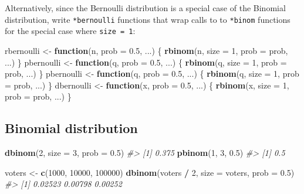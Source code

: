 \documentclass[]{book}
\newenvironment{Shaded}{\begin{snugshade}}{\end{snugshade}}
\newcommand{\KeywordTok}[1]{\textcolor[rgb]{0.13,0.29,0.53}{\textbf{#1}}}
\newcommand{\DataTypeTok}[1]{\textcolor[rgb]{0.13,0.29,0.53}{#1}}
\newcommand{\DecValTok}[1]{\textcolor[rgb]{0.00,0.00,0.81}{#1}}
\newcommand{\FloatTok}[1]{\textcolor[rgb]{0.00,0.00,0.81}{#1}}
\newcommand{\StringTok}[1]{\textcolor[rgb]{0.31,0.60,0.02}{#1}}
\newcommand{\CommentTok}[1]{\textcolor[rgb]{0.56,0.35,0.01}{\textit{#1}}}
\newcommand{\ControlFlowTok}[1]{\textcolor[rgb]{0.13,0.29,0.53}{\textbf{#1}}}
\newcommand{\OperatorTok}[1]{\textcolor[rgb]{0.81,0.36,0.00}{\textbf{#1}}}
\newcommand{\NormalTok}[1]{#1}
\theoremstyle{definition}
\theoremstyle{definition}
\theoremstyle{definition}
\theoremstyle{remark}
\begin{document}
Alternatively, since the Bernoulli distribution is a special case of the
Binomial distribution, write \texttt{*bernoulli} functions that wrap
calls to to \texttt{*binom} functions for the special case where
\texttt{size\ =\ 1}:

\begin{Shaded}
\begin{Highlighting}[]
\NormalTok{rbernoulli <-}\StringTok{ }\ControlFlowTok{function}\NormalTok{(n, }\DataTypeTok{prob =} \FloatTok{0.5}\NormalTok{, ...) \{}
  \KeywordTok{rbinom}\NormalTok{(n, }\DataTypeTok{size =} \DecValTok{1}\NormalTok{, }\DataTypeTok{prob =}\NormalTok{ prob, ...)}
\NormalTok{\}}
\NormalTok{pbernoulli <-}\StringTok{ }\ControlFlowTok{function}\NormalTok{(q, }\DataTypeTok{prob =} \FloatTok{0.5}\NormalTok{, ...) \{}
  \KeywordTok{rbinom}\NormalTok{(q, }\DataTypeTok{size =} \DecValTok{1}\NormalTok{, }\DataTypeTok{prob =}\NormalTok{ prob, ...)}
\NormalTok{\}}
\NormalTok{pbernoulli <-}\StringTok{ }\ControlFlowTok{function}\NormalTok{(q, }\DataTypeTok{prob =} \FloatTok{0.5}\NormalTok{, ...) \{}
  \KeywordTok{rbinom}\NormalTok{(q, }\DataTypeTok{size =} \DecValTok{1}\NormalTok{, }\DataTypeTok{prob =}\NormalTok{ prob, ...)}
\NormalTok{\}}
\NormalTok{dbernoulli <-}\StringTok{ }\ControlFlowTok{function}\NormalTok{(x, }\DataTypeTok{prob =} \FloatTok{0.5}\NormalTok{, ...) \{}
  \KeywordTok{rbinom}\NormalTok{(x, }\DataTypeTok{size =} \DecValTok{1}\NormalTok{, }\DataTypeTok{prob =}\NormalTok{ prob, ...)}
\NormalTok{\}}
\end{Highlighting}
\end{Shaded}

\subsection{Binomial distribution}\label{binomial-distribution}

\begin{Shaded}
\begin{Highlighting}[]
\KeywordTok{dbinom}\NormalTok{(}\DecValTok{2}\NormalTok{, }\DataTypeTok{size =} \DecValTok{3}\NormalTok{, }\DataTypeTok{prob =} \FloatTok{0.5}\NormalTok{)}
\CommentTok{#> [1] 0.375}
\KeywordTok{pbinom}\NormalTok{(}\DecValTok{1}\NormalTok{, }\DecValTok{3}\NormalTok{, }\FloatTok{0.5}\NormalTok{)}
\CommentTok{#> [1] 0.5}
\end{Highlighting}
\end{Shaded}

\begin{Shaded}
\begin{Highlighting}[]
\NormalTok{voters <-}\StringTok{ }\KeywordTok{c}\NormalTok{(}\DecValTok{1000}\NormalTok{, }\DecValTok{10000}\NormalTok{, }\DecValTok{100000}\NormalTok{)}
\KeywordTok{dbinom}\NormalTok{(voters }\OperatorTok{/}\StringTok{ }\DecValTok{2}\NormalTok{, }\DataTypeTok{size =}\NormalTok{ voters, }\DataTypeTok{prob =} \FloatTok{0.5}\NormalTok{)}
\CommentTok{#> [1] 0.02523 0.00798 0.00252}
\end{Highlighting}
\end{Shaded}
\end{document}
